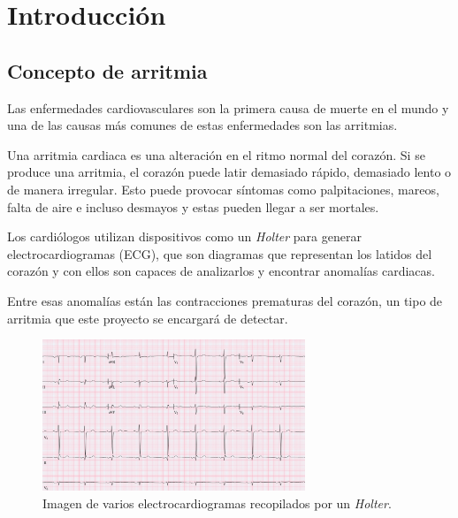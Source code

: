 \titlespacing*{\chapter}{0pt}{-1.25cm}{25pt}
\chapter{Introducción}
\section{Concepto de arritmia}
Las enfermedades cardiovasculares son la primera causa de muerte en el mundo y una de las causas más comunes de estas enfermedades son las arritmias.

Una arritmia cardiaca es una alteración en el ritmo normal del corazón. Si se produce una arritmia, el corazón puede latir demasiado rápido, demasiado lento o de manera irregular. Esto puede provocar síntomas como palpitaciones, mareos, falta de aire e incluso desmayos y estas pueden llegar a ser mortales.

Los cardiólogos utilizan dispositivos como un \textit{Holter} para generar electrocardiogramas (ECG), que son diagramas que representan los latidos del corazón y con ellos son capaces de analizarlos y encontrar anomalías cardiacas.

Entre esas anomalías están las contracciones prematuras del corazón, un tipo de arritmia que este proyecto se encargará de detectar. 

\begin{figure}[h!]
	\centering
	\includegraphics[width=0.7\textwidth]{./Images/img_introduccion/electrocardiograma.png}
	\caption{Imagen de varios electrocardiogramas recopilados por un \textit{Holter}.}
	\label{fig:electrocardiogramas}
\end{figure}

